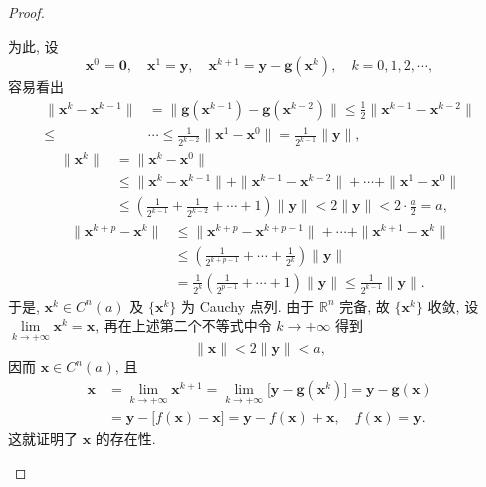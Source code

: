\begin{proof}
\begin{enumerate}
为此, 设
\[
  \boldsymbol{x}^{0} = \boldsymbol{0}, \quad \boldsymbol{x}^{1} = \boldsymbol{y}, \quad \boldsymbol{x}^{k+1} = \boldsymbol{y} - \boldsymbol{g}(\boldsymbol{x}^{k}), \quad k = 0, 1, 2, \cdots,
\]
容易看出
\begin{align*}
  \|\boldsymbol{x}^{k} - \boldsymbol{x}^{k-1}\| &= \|\boldsymbol{g}(\boldsymbol{x}^{k-1}) - \boldsymbol{g}(\boldsymbol{x}^{k-2})\| \leqslant \frac{1}{2}\|\boldsymbol{x}^{k-1} - \boldsymbol{x}^{k-2}\| \\
  \leqslant {} & \cdots \leqslant \frac{1}{2^{k-2}}\|\boldsymbol{x}^{1} - \boldsymbol{x}^{0}\| = \frac{1}{2^{k-1}}\|\boldsymbol{y}\|,
\end{align*}
\begin{align*}
  \|\boldsymbol{x}^{k}\| &= \|\boldsymbol{x}^{k} - \boldsymbol{x}^{0}\| \\
  &\leqslant \|\boldsymbol{x}^{k} - \boldsymbol{x}^{k-1}\| + \|\boldsymbol{x}^{k-1} - \boldsymbol{x}^{k-2}\| + \cdots + \|\boldsymbol{x}^{1} - \boldsymbol{x}^{0}\| \\
  &\leqslant \left(\frac{1}{2^{k-1}} + \frac{1}{2^{k-2}} + \cdots + 1\right)\|\boldsymbol{y}\| < 2\|\boldsymbol{y}\| < 2 \cdot \frac{a}{2} = a,
\end{align*}
\begin{align*}
  \|\boldsymbol{x}^{k+p} - \boldsymbol{x}^{k}\| &\leqslant \|\boldsymbol{x}^{k+p} - \boldsymbol{x}^{k+p-1}\| + \cdots + \|\boldsymbol{x}^{k+1} - \boldsymbol{x}^{k}\| \\
  &\leqslant \left(\frac{1}{2^{k+p-1}} + \cdots + \frac{1}{2^{k}}\right)\|\boldsymbol{y}\| \\
  &= \frac{1}{2^{k}}\left(\frac{1}{2^{p-1}} + \cdots + 1\right)\|\boldsymbol{y}\| \leqslant \frac{1}{2^{k-1}}\|\boldsymbol{y}\|.
\end{align*}
于是, $\boldsymbol{x}^{k} \in C^{n}(a)$ 及 $\{\boldsymbol{x}^{k}\}$ 为 Cauchy 点列. 由于 $\mathbb{R}^{n}$ 完备, 故 $\{\boldsymbol{x}^{k}\}$ 收敛, 设 $\lim\limits_{k \to +\infty}\boldsymbol{x}^{k} = \boldsymbol{x}$, 再在上述第二个不等式中令 $k \to +\infty$ 得到
\[
  \|\boldsymbol{x}\| < 2\|\boldsymbol{y}\| < a,
\]
因而 $\boldsymbol{x} \in C^{n}(a)$, 且
\begin{align*}
  \boldsymbol{x} &= \lim_{k \to +\infty}\boldsymbol{x}^{k+1} = \lim_{k \to +\infty}\bigl[\boldsymbol{y} - \boldsymbol{g}(\boldsymbol{x}^{k})\bigr] = \boldsymbol{y} - \boldsymbol{g}(\boldsymbol{x}) \\
  &= \boldsymbol{y} - \bigl[f(\boldsymbol{x}) - \boldsymbol{x}\bigr] = \boldsymbol{y} - f(\boldsymbol{x}) + \boldsymbol{x}, \quad f(\boldsymbol{x}) = \boldsymbol{y}.
\end{align*}
这就证明了 $\boldsymbol{x}$ 的存在性.


\end{enumerate}
\end{proof}
